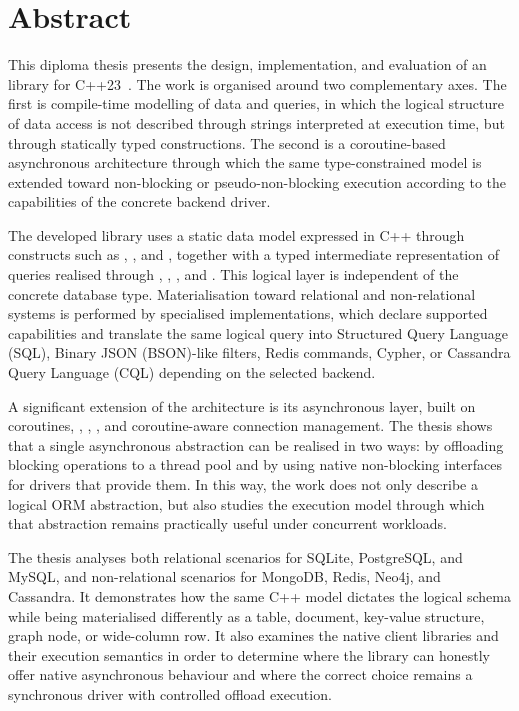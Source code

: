 \section*{Abstract}

This diploma thesis presents the design, implementation, and evaluation of an \ORMName{} library for C++23~\cite{cpp23standard}. The work is organised around two complementary axes. The first is compile-time modelling of data and queries, in which the logical structure of data access is not described through strings interpreted at execution time, but through statically typed  constructions. The second is a coroutine-based asynchronous architecture through which the same type-constrained model is extended toward non-blocking or pseudo-non-blocking execution according to the capabilities of the concrete backend driver.

The developed library uses a static data model expressed in C++ through constructs such as , , and , together with a typed intermediate representation of queries realised through , , , and . This logical layer is independent of the concrete database type. Materialisation toward relational and non-relational systems is performed by specialised  implementations, which declare supported capabilities and translate the same logical query into Structured Query Language (SQL), Binary JSON (BSON)-like filters, Redis commands, Cypher, or Cassandra Query Language (CQL) depending on the selected backend.

A significant extension of the architecture is its asynchronous layer, built on coroutines, , , , and coroutine-aware connection management. The thesis shows that a single asynchronous abstraction can be realised in two ways: by offloading blocking operations to a thread pool and by using native non-blocking interfaces for drivers that provide them. In this way, the work does not only describe a logical ORM abstraction, but also studies the execution model through which that abstraction remains practically useful under concurrent workloads.

The thesis analyses both relational scenarios for SQLite, PostgreSQL, and MySQL, and non-relational scenarios for MongoDB, Redis, Neo4j, and Cassandra. It demonstrates how the same C++ model dictates the logical schema while being materialised differently as a table, document, key-value structure, graph node, or wide-column row. It also examines the native client libraries and their execution semantics in order to determine where the library can honestly offer native asynchronous behaviour and where the correct choice remains a synchronous driver with controlled offload execution.

